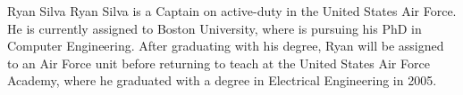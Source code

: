 \documentclass[11pt,journal,compsoc, onecolumn]{IEEEtran}
\begin{document}
\ifCLASSOPTIONcaptionsoff
  \newpage
\fi








\begin{IEEEbiography}{Ryan Silva}
	Ryan Silva is a Captain on active-duty in the United States Air Force.
	He is currently assigned to Boston University, where is pursuing his
	PhD in Computer Engineering. After graduating with his degree, Ryan
	will be assigned to an Air Force unit before returning to teach at the
	United States Air Force Academy, where he graduated with a degree in
	Electrical Engineering in 2005.
\end{IEEEbiography}
\end{document}
